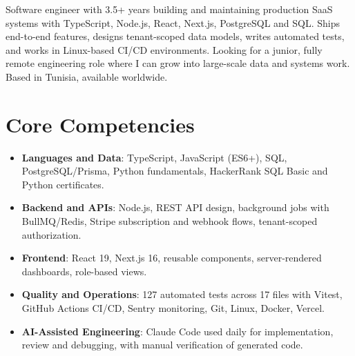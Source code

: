 \documentclass[11pt,a4paper,sans]{moderncv}
\begin{document}
\makecvtitle

\vspace{6pt}
\small{Software engineer with 3.5+ years building and maintaining production SaaS systems with TypeScript, Node.js, React, Next.js, PostgreSQL and SQL. Ships end-to-end features, designs tenant-scoped data models, writes automated tests, and works in Linux-based CI/CD environments. Looking for a junior, fully remote engineering role where I can grow into large-scale data and systems work. Based in Tunisia, available worldwide.}

\section{Core Competencies}
\vspace{1pt}
\begin{itemize}
\item \textbf{Languages and Data}: TypeScript, JavaScript (ES6+), SQL, PostgreSQL/Prisma, Python fundamentals, HackerRank SQL Basic and Python certificates.
\item \textbf{Backend and APIs}: Node.js, REST API design, background jobs with BullMQ/Redis, Stripe subscription and webhook flows, tenant-scoped authorization.
\item \textbf{Frontend}: React 19, Next.js 16, reusable components, server-rendered dashboards, role-based views.
\item \textbf{Quality and Operations}: 127 automated tests across 17 files with Vitest, GitHub Actions CI/CD, Sentry monitoring, Git, Linux, Docker, Vercel.
\item \textbf{AI-Assisted Engineering}: Claude Code used daily for implementation, review and debugging, with manual verification of generated code.
\end{itemize}
\end{document}
